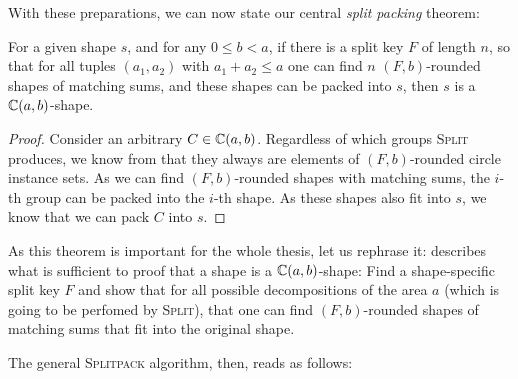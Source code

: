 \documentclass[a4paper,style=print,bibliography=totoc,nexus,lnum,extramargin]{tubsbook}
\begin{document}
%

With these preparations, we can now state our central \emph{split packing} theorem:

\begin{theorem}\label{th:splitpack}
    For a given shape $s$, and for any $0 \le b < a$, if there is a split key $F$ of length $n$, so that for all tuples $(a_1, a_2)$ with $a_1 + a_2 \le a$
    one can find $n$ $(F,b)$-rounded shapes of matching sums,
    and these shapes can be packed into $s$, then $s$ is a $\mathbb{C}(a,b)$-shape.
\end{theorem}

\begin{proof}
    Consider an arbitrary $C \in \mathbb{C}(a,b)$. Regardless of which groups \textsc{Split} produces, we know from  that they always are elements of $(F,b)$-rounded circle instance sets.
    As we can find $(F,b)$-rounded shapes with matching sums, the $i$-th group can be packed into the $i$-th shape.
    As these shapes also fit into $s$, we know that we can pack $C$ into $s$.
\end{proof}

As this theorem is important for the whole thesis, let us rephrase it:  describes what is sufficient to proof that a shape is a $\mathbb{C}(a,b)$-shape: Find a shape-specific split key $F$ and show that for all possible decompositions of the area $a$ (which is going to be perfomed by \textsc{Split}), that one can find $(F,b)$-rounded shapes of matching sums that fit into the original shape.

The general \textsc{Splitpack} algorithm, then, reads as follows:
\end{document}
